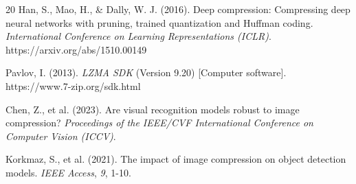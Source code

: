 \documentclass[12pt, a4paper]{article}
\begin{document}
\begin{thebibliography}{20}
Han, S., Mao, H., \& Dally, W. J. (2016). Deep compression: Compressing deep neural networks with pruning, trained quantization and Huffman coding. \textit{International Conference on Learning Representations (ICLR)}. https://arxiv.org/abs/1510.00149

Pavlov, I. (2013). \textit{LZMA SDK} (Version 9.20) [Computer software]. https://www.7-zip.org/sdk.html

Chen, Z., et al. (2023). Are visual recognition models robust to image compression? \textit{Proceedings of the IEEE/CVF International Conference on Computer Vision (ICCV)}.

Korkmaz, S., et al. (2021). The impact of image compression on object detection models. \textit{IEEE Access}, \textit{9}, 1-10.

\end{thebibliography}
\end{document}
